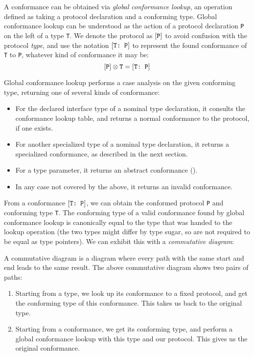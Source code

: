 \documentclass[../generics]{subfiles}
\begin{document}
A conformance can be obtained via \emph{global conformance lookup}, an operation defined as taking a protocol declaration and a conforming type. Global conformance lookup can be understood as the action of a protocol declaration \texttt{P} on the left of a type \texttt{T}. We denote the protocol as $[\texttt{P}]$ to avoid confusion with the protocol \emph{type}, and use the notation $[\texttt{T:~P}]$ to represent the found conformance of \texttt{T} to \texttt{P}, whatever kind of conformance it may be:\index{$\otimes$}
\[[\texttt{P}]\otimes\texttt{T} = [\texttt{T:~P}]\]

Global conformance lookup performs a case analysis on the given conforming type, returning one of several kinds of conformance:
\begin{itemize}
\item For the declared interface type of a nominal type declaration, it consults the conformance lookup table, and returns a normal conformance to the protocol, if one exists.
\item For another specialized type of a nominal type declaration, it returns a specialized conformance, as described in the next section.
\item For a type parameter, it returns an abstract conformance ().
\item In any case not covered by the above, it returns an invalid conformance.
\end{itemize}

From a conformance $[\texttt{T:~P}]$, we can obtain the conformed protocol \texttt{P} and conforming type \texttt{T}. The conforming type of a valid conformance found by global conformance lookup is canonically equal to the type that was handed to the lookup operation (the two types might differ by type sugar, so are not required to be equal as type pointers). We can exhibit this with a \emph{commutative diagram}:
\begin{quote}
\end{quote}
A commutative diagram is a diagram where every path with the same start and end leads to the same result. The above commutative diagram shows two pairs of paths:
\begin{enumerate}
\item Starting from a type, we look up its conformance to a fixed protocol, and get the conforming type of this conformance. This takes us back to the original type.
\item Starting from a conformance, we get its conforming type, and perform a global conformance lookup with this type and our protocol. This gives us the original conformance.
\end{enumerate}
\end{document}
